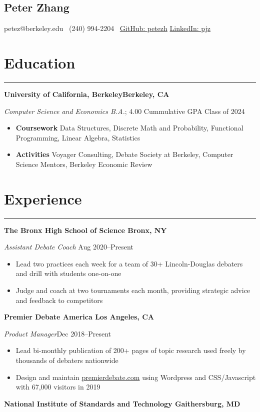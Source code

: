 \documentclass[11pt]{article}
\newcommand{\name}[1]{\begin{center}\section*{\huge \color{highlight} #1}\end{center}}
\newcommand{\topinfo}[1]{\begin{center}\vspace{-0.2cm}#1\vspace{-0.2cm}\end{center}}
\newcommand{\resumesection}[1]{\vspace{-0.3cm}\section*{\color{highlight}#1}\vspace{-0.3cm}\hrule\vspace{0.3cm}}
\begin{document}
\name{Peter Zhang}
\topinfo{petez@berkeley.edu \textbullet\ (240) 994-2204 \textbullet\ \href{https://github.com/petezh}{GitHub: petezh} \textbullet \href{https://www.linkedin.com/in/pjz/}{LinkedIn: pjz}}

\resumesection{Education}

\textbf{University of California, Berkeley\hfill Berkeley, CA} \par
\textit{Computer Science and Economics B.A.}; 4.00 Cummulative GPA \hfill Class of 2024
\begin{itemize}
	\item \textbf{Coursework} Data Structures, Discrete Math and Probability, Functional Programming, Linear Algebra, Statistics
	\item \textbf{Activities} Voyager Consulting, Debate Society at Berkeley, Computer Science Mentors, Berkeley Economic Review
\end{itemize}

\resumesection{Experience}

\textbf{The Bronx High School of Science \hfill Bronx, NY} \par

\textit{Assistant Debate Coach} \hfill Aug 2020--Present
\begin{itemize}
	\item Lead two practices each week for a team of 30+ Lincoln-Douglas debaters and drill with students one-on-one
	\item Judge and coach at two tournaments each month, providing strategic advice and feedback to competitors
\end{itemize}\vspace{0.1cm}

\textbf{Premier Debate America \hfill Los Angeles, CA} \par

\textit{Product Manager}\hfill Dec 2018--Present
\begin{itemize}
	\item Lead bi-monthly publication of 200+ pages of topic research used freely by thousands of debaters nationwide
	\item Design and maintain \href{https://www.premierdebate.com/briefs/}{premierdebate.com} using Wordpress and CSS/Javascript with 67,000 visitors in 2019
\end{itemize}\vspace{0.1cm}

\textbf{National Institute of Standards and Technology \hfill Gaithersburg, MD}\par
\end{document}
